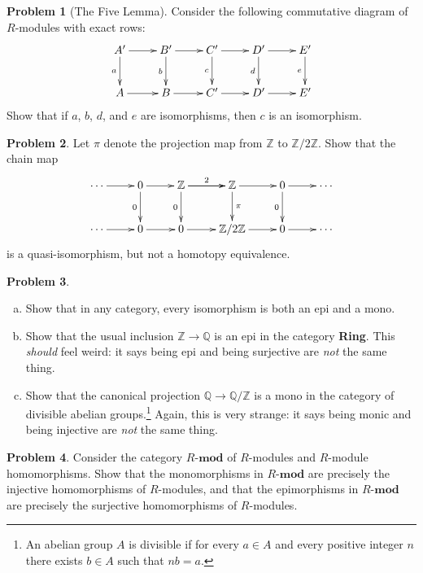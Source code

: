 \documentclass[11pt]{article}
\newcommand{\ZZ}{\mathbb{Z}}
\theoremstyle{definition}
\newtheorem{problem}{Problem}
\begin{document}
\begin{problem}[The Five Lemma]
	Consider the following commutative diagram of $R$-modules with exact rows:
	$$\xymatrix{A' \ar[d]_-a \ar[r] & B' \ar[r] \ar[d]_-b & C' \ar[r] \ar[d]_-c & D' \ar[d]_-d \ar[r] & E' \ar[d]_-e \\
	A \ar[r] & B \ar[r] & C' \ar[r] & D' \ar[r] & E'}$$
	Show that if $a$, $b$, $d$, and $e$ are isomorphisms, then $c$ is an isomorphism.
\end{problem}


\begin{problem}
	Let $\pi$ denote the projection map from $\ZZ$ to $\ZZ/2\ZZ$. Show that the chain map
	$$\xymatrix{\cdots \ar[r] & 0 \ar[r] \ar[d]_-0 & \ZZ \ar[r]^-2 \ar[d]_-0 \ar[r] & \ZZ \ar[d]^-{\pi} \ar[r] & 0 \ar[d]_-0 \ar[r] & \cdots \\ 
	\cdots \ar[r] & 0 \ar[r] & 0 \ar[r] & \ZZ/2\ZZ \ar[r] & 0 \ar[r] & \cdots}$$
	is a quasi-isomorphism, but not a homotopy equivalence.
\end{problem}


\newpage

\begin{problem}$\,$
		\begin{enumerate}[a)]
		\item Show that in any category, every isomorphism is both an epi and a mono.
		\item Show that the usual inclusion $\mathbb{Z} \longrightarrow \mathbb{Q}$ is an epi in the category {\bf Ring}. This \emph{should} feel weird: it says being epi and being surjective are \emph{not} the same thing.
		\item Show that the canonical projection $\mathbb{Q} \longrightarrow \mathbb{Q}/\ZZ$ is a mono in the category of divisible abelian groups.\footnote{An abelian group $A$ is divisible if for every $a \in A$ and every positive integer $n$ there exists $b \in A$ such that $nb = a$.} Again, this is very strange: it says being monic and being injective are \emph{not} the same thing. 
		\end{enumerate}
\end{problem}


\begin{problem}
	Consider the category $R\textbf{-mod}$ of $R$-modules and $R$-module homomorphisms. Show that the monomorphisms in $R\textbf{-mod}$ are precisely the injective homomorphisms of $R$-modules, and that the epimorphisms in $R\textbf{-mod}$ are precisely the surjective homomorphisms of $R$-modules.
\end{problem}
\end{document}
